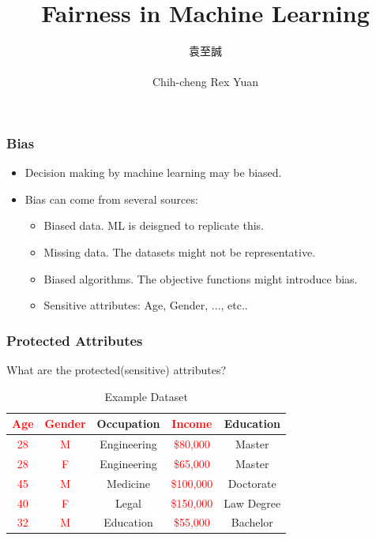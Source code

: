 \documentclass{beamer}
\date{\displaydate{date}}
\title[Fairness]{Fairness in Machine Learning}
\author[Rex]{\begin{CJK}{UTF8}{bsmi}袁至誠\end{CJK}\\Chih-cheng Rex Yuan}
\institute[IIS]{Institute of Information Science}
\newcommand{\red}[1]{\textcolor{red}{#1}}
\begin{document}
\begin{frame}
\titlepage
\end{frame}

\begin{frame}
    \frametitle{Bias}
    \begin{itemize}
        \item Decision making by machine learning may be biased.
        \item Bias can come from several sources:
        \begin{itemize}
            \item Biased data. ML is deisgned to replicate this.
            \item Missing data. The datasets might not be representative.
            \item Biased algorithms. The objective functions might introduce bias.
            \item Sensitive attributes: Age, Gender, ..., etc..
        \end{itemize}
    \end{itemize}
\end{frame}

\begin{frame}
    \frametitle{Protected Attributes}
    What are the protected(sensitive) attributes?
    \begin{table}
        \begin{tabular}{|c|c|c|c|c|}
            \hline
            \red{Age} & \red{Gender} & Occupation & \red{Income} & Education \\
            \hline
            \red{28} & \red{M} & Engineering & \red{\$80,000} & Master \\
            \red{28} & \red{F} & Engineering & \red{\$65,000} & Master \\
            \red{45} & \red{M} & Medicine    & \red{\$100,000} & Doctorate \\
            \red{40} & \red{F} & Legal       & \red{\$150,000} & Law Degree \\
            \red{32} & \red{M} & Education   & \red{\$55,000} & Bachelor \\
            \hline
        \end{tabular}
        \caption{Example Dataset}
    \end{table}
\end{frame}
\end{document}
